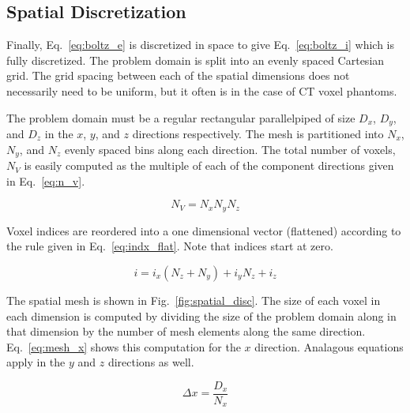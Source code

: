 \subsection{Spatial Discretization}

Finally, Eq.~\ref{eq:boltz_e} is discretized in space to give Eq.~\ref{eq:boltz_i} which is fully discretized. The problem domain is split into an evenly spaced Cartesian grid. The grid spacing between each of the spatial dimensions does not necessarily need to be uniform, but it often is in the case of CT voxel phantoms.

The problem domain must be a regular rectangular parallelpiped of size $D_x$, $D_y$, and $D_z$ in the $x$, $y$, and $z$ directions respectively. The mesh is partitioned into $N_x$, $N_y$, and $N_z$ evenly spaced bins along each direction. The total number of voxels, $N_V$ is easily computed as the multiple of each of the component directions given in Eq.~\ref{eq:n_v}.

\begin{equation} \label{eq:n_v}
	N_V = N_x N_y N_z
\end{equation}

Voxel indices are reordered into a one dimensional vector (flattened) according to the rule given in Eq.~\ref{eq:indx_flat}. Note that indices start at zero.

\begin{equation} \label{eq:indx_flat}
	i = i_x (N_z + N_y) + i_y N_z + i_z
\end{equation}

The spatial mesh is shown in Fig.~\ref{fig:spatial_disc}. The size of each voxel in each dimension is computed by dividing the size of the problem domain along in that dimension by the number of mesh elements along the same direction. Eq.~\ref{eq:mesh_x} shows this computation for the $x$ direction. Analagous equations apply in the $y$ and $z$ directions as well.

\begin{equation} \label{eq:mesh_x}
\Delta x = \frac{D_x}{N_x}
\end{equation}

